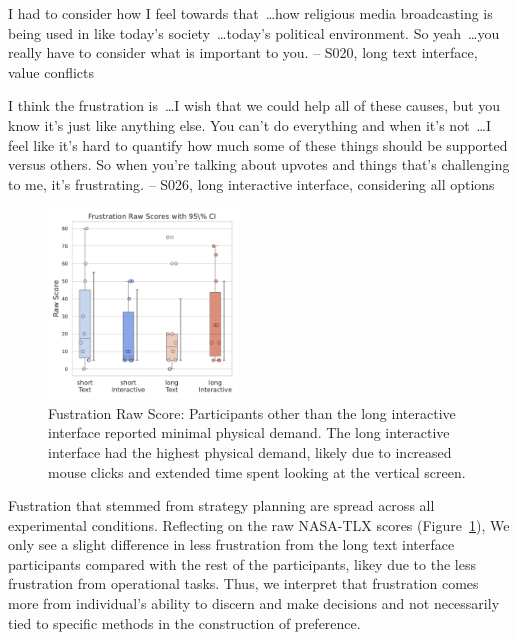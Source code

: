 \begin{displayquote}
I had to consider how I feel towards that~\ldots how religious media broadcasting is being used in like today's society~\ldots today's political environment. So yeah~\ldots you really have to consider what is important to you. 
\noindent \hfill -- S020, long text interface, value conflicts
\end{displayquote}

\begin{displayquote}
I think the frustration is~\ldots I wish that we could help all of these causes, but you know it's just like anything else. You can't do everything and when it's not~\ldots  I feel like it's hard to quantify how much some of these things should be supported versus others. So when you're talking about upvotes and things that's challenging to me, it's frustrating.
\noindent \hfill -- S026, long interactive interface, considering all options
\end{displayquote}

\begin{figure} %
    \centering
    \includegraphics[width=0.45\textwidth, trim=0 13 0 13, clip]{content/image/cog/Frustration_scores.pdf}
    \captionsetup{width=0.40\textwidth, justification=justified} %
    \caption{Fustration Raw Score: Participants other than the long interactive interface reported minimal physical demand. The long interactive interface had the highest physical demand, likely due to increased mouse clicks and extended time spent looking at the vertical screen.}
    \label{fig:fustration_cog_score}
\end{figure}

Fustration that stemmed from strategy planning are spread across all experimental conditions. Reflecting on the raw NASA-TLX scores (Figure~\ref{fig:fustration_cog_score}), We only see a slight difference in less frustration from the long text interface participants compared with the rest of the participants, likey due to the less frustration from operational tasks. Thus, we interpret that frustration comes more from individual's ability to discern and make decisions and not necessarily tied to specific methods in the construction of preference.

